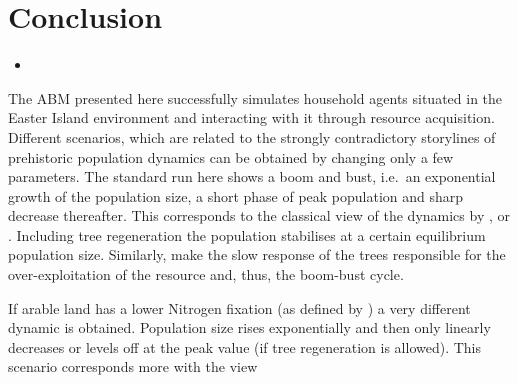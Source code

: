
\chapter{Conclusion}
\begin{itemize}
	\item 
\end{itemize}

The ABM presented here successfully simulates household agents situated in the Easter Island environment and interacting with it through resource acquisition. 
Different scenarios, which are related to the strongly contradictory storylines of prehistoric population dynamics can be obtained by changing only a few parameters.
The standard run here shows a boom and bust, i.e.\ an exponential growth of the population size, a short phase of peak population and sharp decrease thereafter.
This corresponds to the classical view of the dynamics by \citet{Brander1998}, \citet{Diamond2005} or \citet{Bahn2017}.
Including tree regeneration the population stabilises at a certain equilibrium population size.
Similarly, \citet{Brander1998} make the slow response of the trees responsible for the over-exploitation of the resource and, thus, the boom-bust cycle.

If arable land has a lower Nitrogen fixation (as defined by \citet{Puleston2017}) a very different dynamic is obtained.
Population size rises exponentially and then only linearly decreases or levels off at the peak value (if tree regeneration is allowed). 
This scenario corresponds more with the view 



